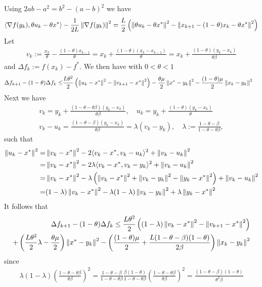 \documentclass[english,12pt,a4paper]{article}
\begin{document}
Using $2ab -a^2 = b^2-(a-b)^2$ we have
%
\begin{align*}
\langle\nabla f(y_k),\theta u_k -\theta x^*\rangle -\frac{1}{2L}\left\|\nabla f(y_k)\right\|^2 = \frac{L}{2}\left( \left\|\theta u_k -\theta x^*\right\|^2 - \left\|x_{k+1}-(1-\theta)x_k -\theta x^*\right\|^2\right)
\end{align*}
%
Let
%
\begin{align*}
v_k := \frac{x_k}{\theta}-\frac{(1-\theta)x_{k-1}}{\theta}  = x_{k} + \frac{(1-\theta)(x_k-x_{k-1})}{\theta} = x_{k} + \frac{(1-\theta)(y_k-x_{k})}{\theta\beta}
\end{align*}
%
and $\Delta f_k:= f(x_k)-f^*$.  We then have with $0<\theta<1$
%
\begin{align*}
\Delta f_{k+1} -(1-\theta)\Delta f_k \le&  \frac{L\theta^2}{2}\left( \left\|u_k -x^*\right\|^2 - \left\|v_{k+1}-x^*\right\|^2\right) -\frac{\theta\mu}{2}\left\|x^*-y_k\right\|^2 -\frac{(1-\theta)\mu}{2}\left\|x_k-y_k\right\|^2
\end{align*}
%
Next we have
%
\begin{align*}
v_k  = y_{k} + \frac{(1-\theta-\theta\beta)(y_k-x_{k})}{\theta\beta},\quad u_k = y_k + \frac{(1-\theta)(y_k-x_k)}{\theta}\\
v_k - u_k = \frac{(1-\theta-\beta)(y_k-x_{k})}{\theta\beta} = \lambda(v_k-y_k),\quad \lambda := \frac{1-\theta-\beta}{1-\theta-\theta\beta},
\end{align*}
%
such that
%
\begin{align*}
\left\|u_k-x^*\right\|^2 =&  \left\|v_k-x^*\right\|^2 -2\langle v_k-x^*,v_k-u_k\rangle^2 + \left\|v_k-u_k\right\|^2\\
=& \left\|v_k-x^*\right\|^2 -2\lambda\langle v_k-x^*,v_k-y_k\rangle^2 + \left\|v_k-u_k\right\|^2\\
=& \left\|v_k-x^*\right\|^2 -\lambda\left(\left\|v_k-x^*\right\|^2 + \left\|v_k-y_k\right\|^2 - \left\|y_k-x^*\right\|^2\right) + \left\|v_k-u_k\right\|^2\\
=& (1-\lambda)\left\|v_k-x^*\right\|^2 -\lambda(1-\lambda) \left\|v_k-y_k\right\|^2 + \lambda\left\|y_k-x^*\right\|^2
\end{align*}
%
It follows that
%
\begin{align*}
\Delta f_{k+1} -(1-\theta)\Delta f_k \le  \frac{L\theta^2}{2}\left( (1-\lambda)\left\|v_k -x^*\right\|^2 - \left\|v_{k+1}-x^*\right\|^2\right)\\
 + \left( \frac{L\theta^2}{2}\lambda - \frac{\theta\mu}{2}\right)\left\|x^*-y_k\right\|^2 -\left(\frac{(1-\theta)\mu}{2}+\frac{L(1-\theta-\beta) (1-\theta)}{2\beta}\right)\left\|x_k-y_k\right\|^2
\end{align*}
%
since
%
\begin{align*}
\lambda(1-\lambda)\left(\frac{1-\theta-\theta\beta}{\theta\beta}\right)^2 =  \frac{1-\theta-\beta}{1-\theta-\theta\beta} \frac{\beta(1-\theta)}{1-\theta-\theta\beta}\left(\frac{1-\theta-\theta\beta}{\theta\beta}\right)^2 =
\frac{(1-\theta-\beta) (1-\theta)}{\theta^2\beta}
\end{align*}
\end{document}
